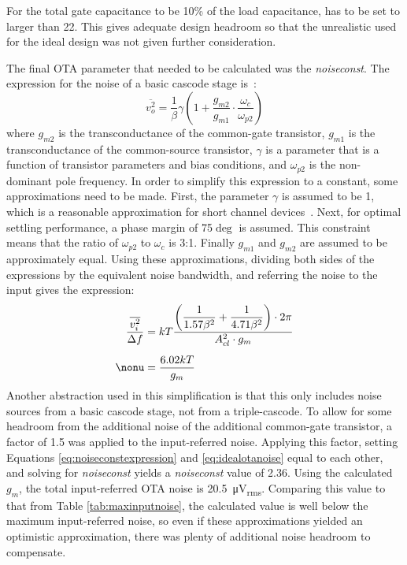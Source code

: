 For the total gate capacitance to be 10\% of the load capacitance, \gmid\spc has to be set to larger than 22. This gives adequate design headroom so that the unrealistic \gmid\spc used for the ideal design was not given further consideration.

The final OTA parameter that needed to be calculated was the \emph{noiseconst}. The expression for the noise of a basic cascode stage is~\cite{315areader}:
\begin{equation}
\label{eq:cascoutputnoise}
\overline{v_{o}^{2}} = \dfrac{1}{\beta}\gamma\left(1+\dfrac{g_{m2}}{g_{m1}}\cdot\dfrac{\omega_{c}}{\omega_{p2}}\right)
\end{equation}
where $g_{m2}$ is the transconductance of the common-gate transistor, $g_{m1}$ is the transconductance of the common-source transistor, $\gamma$ is a parameter that is a function of transistor parameters and bias conditions, and $\omega_{p2}$ is the non-dominant pole frequency. In order to simplify this expression to a constant, some approximations need to be made. First, the parameter $\gamma$ is assumed to be 1, which is a reasonable approximation for short channel devices~\cite{1202575}. Next, for optimal settling performance, a phase margin of 75$\deg$ is assumed. This constraint means that the ratio of $\omega_{p2}$ to $\omega_{c}$ is 3:1. Finally $g_{m1}$ and $g_{m2}$ are assumed to be approximately equal. Using these approximations, dividing both sides of the expressions by the equivalent noise bandwidth, and referring the noise to the input gives the expression:
\begin{align}
\label{eq:noiseconstexpression}
\dfrac{\overline{v_{i}^{2}}}{\Delta f} &= kT\dfrac{\left(\dfrac{1}{1.57\beta^{2}}+\dfrac{1}{4.71\beta^{2}}\right)\cdot 2\pi}{A_{cl}^{2}\cdot g_{m}} \\[0.5em]
\nonu &= \dfrac{6.02kT}{g_{m}}
\end{align}
Another abstraction used in this simplification is that this only includes noise sources from a basic cascode stage, not from a triple-cascode. To allow for some headroom from the additional noise of the additional common-gate transistor, a factor of 1.5 was applied to the input-referred noise. Applying this factor, setting Equations \ref{eq:noiseconstexpression} and \ref{eq:idealotanoise} equal to each other, and solving for \emph{noiseconst} yields a \emph{noiseconst} value of 2.36. Using the calculated $g_{m}$, the total input-referred OTA noise is \SI{20.5}{\micro\volt_{rms}}. Comparing this value to that from Table \ref{tab:maxinputnoise}, the calculated value is well below the maximum input-referred noise, so even if these approximations yielded an optimistic approximation, there was plenty of additional noise headroom to compensate.

